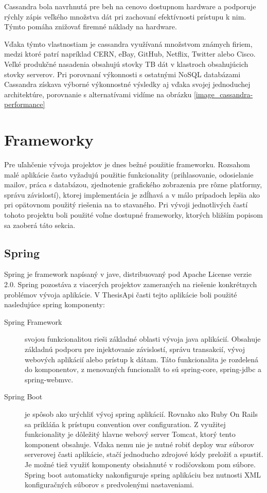 	Cassandra bola navrhnutá pre beh na cenovo dostupnom hardware a podporuje rýchly zápis veľkého množstva dát pri zachovaní efektívnosti prístupu k nim. Týmto pomáha znižovať firemné náklady na hardware.
	
	Vďaka týmto vlastnostiam je cassandra využívaná množstvom známych firiem, medzi ktoré patrí napríklad CERN, eBay, GitHub, Netflix, Twitter alebo Cisco. Veľké produkčné nasadenia obsahujú stovky TB dát v klastroch obsahujúcich stovky serverov. Pri porovnaní výkonnosti s ostatnými NoSQL databázami  Cassandra získava výborné výkonnostné výsledky aj vďaka svojej jednoduchej architektúre, porovnanie s alternatívami vidíme na obrázku \ref{image_cassandra-performance}
	
	
\section{Frameworky}
	Pre uľahčenie vývoja projektov je dnes bežné použitie frameworku. Rozsahom malé aplikácie často vyžadujú použitie funkcionality (prihlasovanie, odosielanie mailov, práca s databázou, zjednotenie grafického zobrazenia pre rôzne platformy, správu závislostí), ktorej implementácia je zdĺhavá a v málo prípadoch lepšia ako pri opätovnom použitý riešenia na to stavaného. Pri vývoji jednotlivých častí tohoto projektu boli použité voľne dostupné frameworky, ktorých bližším popisom sa zaoberá táto sekcia.

	\subsection{Spring}
	Spring je framework napísaný v jave, distribuovaný pod Apache License verzie 2.0. Spring pozostáva z viacerých projektov zameraných na riešenie konkrétnych problémov vývoja aplikácie. V ThesisApi časti tejto aplikácie boli použité nasledujúce spring komponenty:
	\begin{description}
		\item[Spring Framework] svojou funkcionalitou rieši základné oblasti vývoja java aplikácií. Obsahuje základnú podporu pre injektovanie závislostí, správu transakcií, vývoj webových aplikácií alebo prístup k dátam. Táto funkcionalita je rozdelená do komponentov, z menovaných funcionalít to sú spring-core, spring-jdbc a spring-webmvc.
		
		\item[Spring Boot] je spôsob ako urýchliť vývoj spring aplikácií. Rovnako ako Ruby On Rails sa prikláňa k prístupu convention over configuration. Z využitej funkcionality je dôležitý hlavne webový server Tomcat, ktorý tento komponent obsahuje. Vďaka nemu nie je nutné robiť deploy war súborov serverovej časti aplikácie, stačí jednoducho zdrojové kódy preložiť a spustiť. Je možné tiež využiť komponenty obsiahnuté v rodičovskom pom súbore. Spring boot automaticky nakonfiguruje spring aplikáciu bez nutnosti XML konfiguračných súborov s predvolenými nastaveniami.
	\end{description}
		
